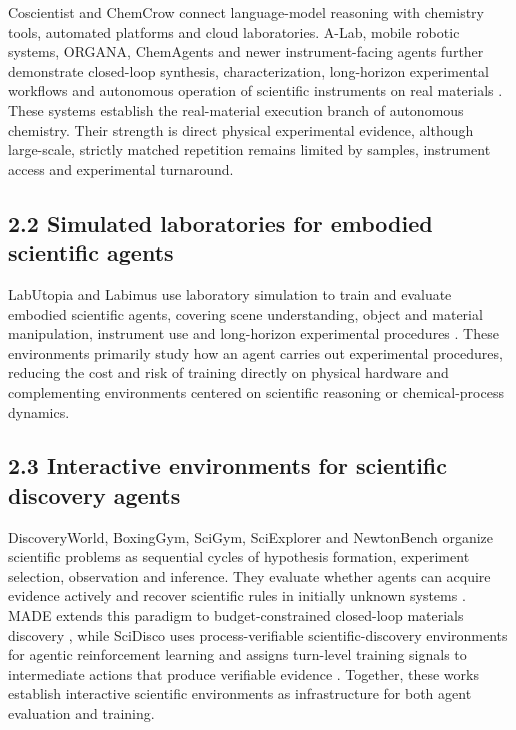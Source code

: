 \documentclass[10pt,twocolumn]{article}
\begin{document}
Coscientist and ChemCrow connect language-model reasoning with chemistry
tools, automated platforms and cloud laboratories. A-Lab, mobile robotic
systems, ORGANA, ChemAgents and newer instrument-facing agents further
demonstrate closed-loop synthesis, characterization, long-horizon
experimental workflows and autonomous operation of scientific
instruments on real materials
\citep{boiko2023autonomous, bran2024augmenting, szymanski2023alab, dai2024mobile, darvish2025organa, song2025chemagents, panapitiya2026autolabs, pilon2026robochemflex, vriza2026instruments}.
These systems establish the real-material execution branch of autonomous
chemistry. Their strength is direct physical experimental evidence,
although large-scale, strictly matched repetition remains limited by
samples, instrument access and experimental turnaround.

\subsection{2.2 Simulated laboratories for embodied scientific
agents}\label{simulated-laboratories-for-embodied-scientific-agents}

LabUtopia and Labimus use laboratory simulation to train and evaluate
embodied scientific agents, covering scene understanding, object and
material manipulation, instrument use and long-horizon experimental
procedures \citep{li2025labutopia, wu2026labimus}. These environments
primarily study how an agent carries out experimental procedures,
reducing the cost and risk of training directly on physical hardware and
complementing environments centered on scientific reasoning or
chemical-process dynamics.

\subsection{2.3 Interactive environments for scientific discovery
agents}\label{interactive-environments-for-scientific-discovery-agents}

DiscoveryWorld, BoxingGym, SciGym, SciExplorer and NewtonBench organize
scientific problems as sequential cycles of hypothesis formation,
experiment selection, observation and inference. They evaluate whether
agents can acquire evidence actively and recover scientific rules in
initially unknown systems
\citep{jansen2024discoveryworld, gandhi2025boxinggym, duan2025scigym, nagele2026sciexplorer, zheng2026newtonbench}.
MADE extends this paradigm to budget-constrained closed-loop materials
discovery \citep{malik2026made}, while SciDisco uses process-verifiable
scientific-discovery environments for agentic reinforcement learning and
assigns turn-level training signals to intermediate actions that produce
verifiable evidence \citep{xu2026scidisco}. Together, these works
establish interactive scientific environments as infrastructure for both
agent evaluation and training.
\end{document}
